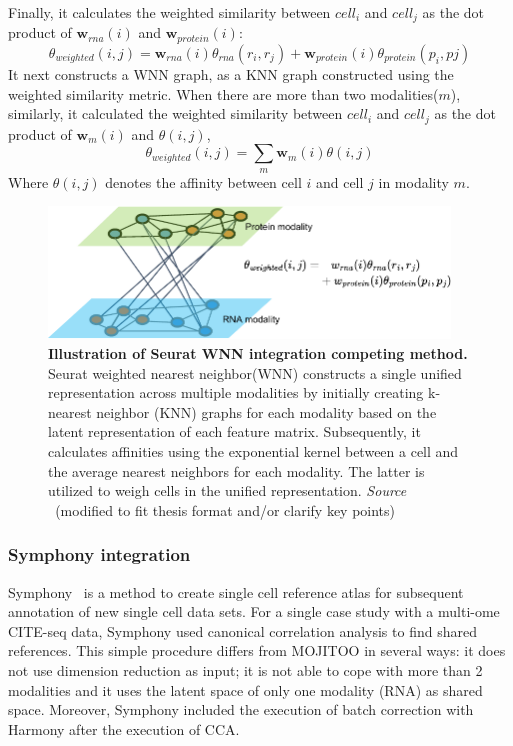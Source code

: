 Finally, it calculates the weighted similarity between $cell_i$ and $cell_j$ as the dot product of $\textbf{w}_{rna}(i)$ and $\textbf{w}_{protein}(i)$:
\begin{equation}
	\theta_{weighted}(i,j)=\textbf{w}_{rna}(i)\theta_{rna}(r_i,r_j) + \textbf{w}_{protein}(i)\theta_{protein}(p_i,pj)
\end{equation}
It next constructs a WNN graph, as a KNN graph constructed using the weighted similarity metric. When there are more than two modalities($m$), similarly, it calculated the weighted similarity between $cell_i$ and $cell_j$ as the dot product of $\textbf{w}_m(i)$ and $\theta(i,j)$,
\begin{equation}
	\theta_{weighted}(i,j)=\sum_{m} \textbf{w}_m(i)\theta(i,j)
\end{equation}
Where $\theta(i,j)$ denotes the affinity between cell $i$ and cell $j$ in modality $m$.

\begin{figure}[!ht]
	\centering
	\includegraphics[width=0.95\textwidth]{Alg_WNN/fig}
	\vspace{0.1cm}
	\caption[Illustration of Seurat WNN integration competing method.]{\textbf{Illustration of Seurat WNN integration competing method.} Seurat weighted nearest neighbor(WNN) constructs a single unified representation across multiple modalities by initially creating k-nearest neighbor (KNN) graphs for each modality based on the latent representation of each feature matrix. Subsequently, it calculates affinities using the exponential kernel between a cell and the average nearest neighbors for each modality. The latter is utilized to weigh cells in the unified representation. \emph{Source ~\cite{hao2021seurat4}}(modified to fit thesis format and/or clarify key points)
}
	\label{fig:Alg_WNN}
\end{figure}


\subsubsection{Symphony integration}
Symphony~\cite{kang2021symphony} is a method to create single cell reference atlas for subsequent annotation of new single cell data sets. For a single case study with a multi-ome CITE-seq data, Symphony used canonical correlation analysis to find shared references. This simple procedure differs from MOJITOO in several ways: it does not use dimension reduction as input; it is not able to cope with more than 2 modalities and it uses the latent space of only one modality (RNA) as shared space.  Moreover, Symphony included the execution of batch correction with Harmony after the execution of CCA.

